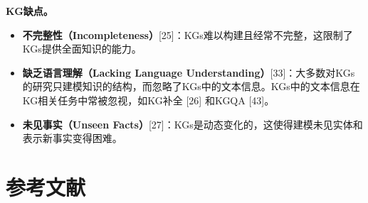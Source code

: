 \textbf{KG缺点。}

\begin{itemize}
\item \textbf{不完整性（Incompleteness）}[25]：KGs难以构建且经常不完整，这限制了KGs提供全面知识的能力。

\item \textbf{缺乏语言理解（Lacking Language Understanding）}[33]：大多数对KGs的研究只建模知识的结构，而忽略了KGs中的文本信息。KGs中的文本信息在KG相关任务中常被忽视，如KG补全 [26] 和KGQA [43]。

\item \textbf{未见事实（Unseen Facts）}[27]：KGs是动态变化的，这使得建模未见实体和表示新事实变得困难。
\end{itemize}

\section*{参考文献}

